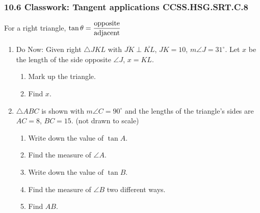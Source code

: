 \documentclass[12pt, twoside]{article}
\begin{document}
\subsubsection*{10.6 Classwork: Tangent applications \hfill CCSS.HSG.SRT.C.8}
For a right triangle, $\displaystyle \tan \theta = \frac{\rm{opposite}}{\rm{adjacent}}$
\begin{enumerate}
\item Do Now: Given right $\triangle JKL$ with $\overline{JK} \perp \overline{KL}$, $JK=10$, $m\angle J=31^\circ$. Let $x$ be the length of the side opposite $\angle J$, $x=KL$.
\begin{enumerate}
  \item Mark up the triangle.
  \item Find $x$.
\end{enumerate}
    \begin{flushright}
      \end{flushright}

\item $\triangle ABC$ is shown with $m\angle C=90^\circ$ and the lengths of the triangle's sides are $AC=8$, $BC=15$.  \hfill (not drawn to scale)
  \begin{multicols}{2}
    \begin{enumerate}
      \item Write down the value of $\tan A$. \vspace{1.25cm}
      \item Find the measure of $\angle A$. \vspace{1cm}
      \item Write down the value of $\tan B$. \vspace{1.25cm}
      \item Find the measure of $\angle B$ two different ways. \vspace{1cm}
      \item Find $AB$.
    \end{enumerate}
    \begin{flushright}
    \end{flushright}
  \end{multicols}
  \vspace{3cm}


\end{enumerate}
\end{document}
